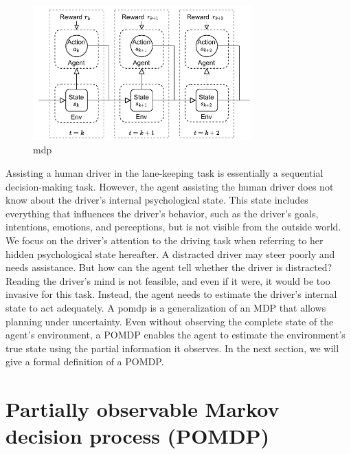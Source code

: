 \begin{figure}[htbp]
    \centering
    \includegraphics[width=0.75\textwidth]{figures/MDP.pdf}
    \caption{\acrfull{mdp}}
    \label{fig:mdp}
\end{figure}

\noindent
Assisting a human driver in the lane-keeping task is essentially a sequential decision-making task. However, the agent assisting the human driver does not know about the driver's internal psychological state. This state includes everything that influences the driver's behavior, such as the driver's goals, intentions, emotions, and perceptions, but is not visible from the outside world. We focus on the driver's attention to the driving task when referring to her hidden psychological state hereafter. A distracted driver may steer poorly and needs assistance. But how can the agent tell whether the driver is distracted? Reading the driver's mind is not feasible, and even if it were, it would be too invasive for this task. Instead, the agent needs to estimate the driver's internal state to act adequately. A \acrfull{pomdp} is a generalization of an MDP that allows planning under uncertainty. Even without observing the complete state of the agent's environment, a POMDP enables the agent to estimate the environment's true state using the partial information it observes. In the next section, we will give a formal definition of a POMDP.

\section{Partially observable Markov decision process (POMDP)}
\label{sec:pomdp}

